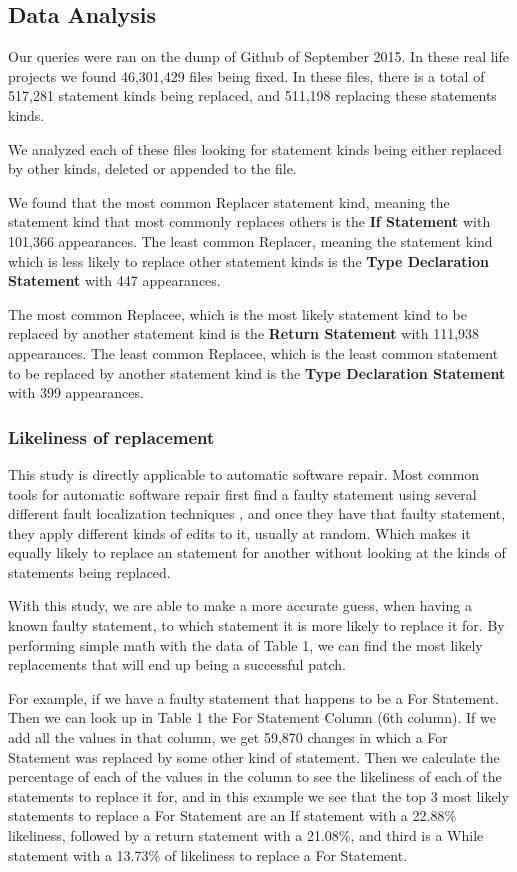 \documentclass{sig-alternate-05-2015}
\begin{document}
\subsection{Data Analysis}
Our queries were ran on the dump of Github of September 2015. In these real life projects we found 46,301,429 files being fixed. In these files, there is a total of 517,281 statement kinds being replaced, and 511,198 replacing these statements kinds.

We analyzed each of these files looking for statement kinds being either replaced by other kinds, deleted or appended to the file.

We found that the most common Replacer statement kind, meaning the statement kind that most commonly replaces others is the \textbf{If Statement} with 101,366 appearances. The least common Replacer, meaning the statement kind which is less likely to replace other statement kinds is the \textbf{Type Declaration Statement} with 447 appearances.

The most common Replacee, which is the most likely statement kind to be replaced by another statement kind is the \textbf{Return Statement} with 111,938 appearances. The least common Replacee, which is the least common statement to be replaced by another statement kind is the \textbf{Type Declaration Statement} with 399 appearances.

\subsubsection{Likeliness of replacement}
This study is directly applicable to automatic software repair. Most common tools for automatic software repair \cite{dongsun}\cite{weimer}\cite{claire} first find a faulty statement using several different fault localization techniques \cite{zach}, and once they have that faulty statement, they apply different kinds of edits to it, usually at random. Which makes it equally likely to replace an statement for another without looking at the kinds of statements being replaced.

With this study, we are able to make a more accurate guess, when having a known faulty statement, to which statement it is more likely to replace it for. By performing simple math with the data of Table 1, we can find the most likely replacements that will end up being a successful patch. 

For example, if we have a faulty statement that happens to be a For Statement. Then we can look up in Table 1 the For Statement Column (6th column). If we add all the values in that column, we get 59,870 changes in which a For Statement was replaced by some other kind of statement. Then we calculate the percentage of each of the values in the column to see the likeliness of each of the statements to replace it for, and in this example we see that the top 3 most likely statements to replace a For Statement are an If statement with a 22.88\% likeliness, followed by a return statement with a 21.08\%, and third is a While statement with a 13.73\% of likeliness to replace a For Statement.
\end{document}
